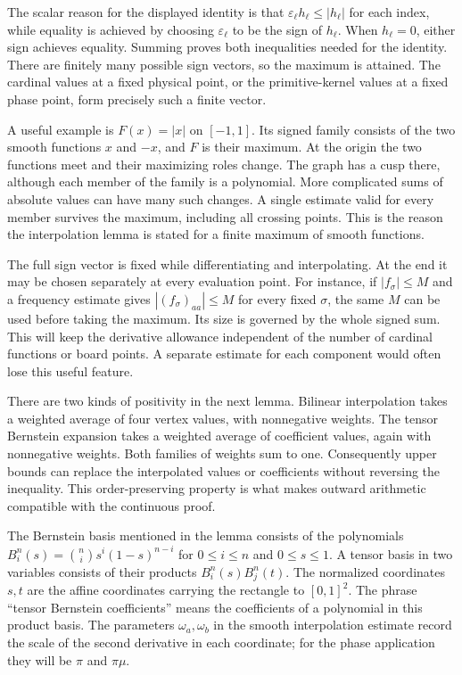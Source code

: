 The scalar reason for the displayed identity is that
$\varepsilon_\ell h_\ell\leq|h_\ell|$ for each index, while equality
is achieved by choosing $\varepsilon_\ell$ to be the sign of $h_\ell$.
When $h_\ell=0$, either sign achieves equality. Summing proves both
inequalities needed for the identity. There are finitely many possible
sign vectors, so the maximum is attained. The cardinal values at a
fixed physical point, or the primitive-kernel values at a fixed phase
point, form precisely such a finite vector.

A useful example is $F(x)=|x|$ on $[-1,1]$. Its signed family consists
of the two smooth functions $x$ and $-x$, and $F$ is their maximum.
At the origin the two functions meet and their maximizing roles change.
The graph has a cusp there, although each member of the family is a
polynomial. More complicated sums of absolute values can have many
such changes. A single estimate valid for every member survives the
maximum, including all crossing points. This is the reason the
interpolation lemma is stated for a finite maximum of smooth functions.

The full sign vector is fixed while differentiating and interpolating.
At the end it may be chosen separately at every evaluation point.
For instance, if $|f_\sigma|\leq M$ and a frequency estimate gives
$|(f_\sigma)_{aa}|\leq M$ for every fixed $\sigma$, the same $M$
can be used before taking the maximum. Its size is governed by the
whole signed sum. This will keep the derivative allowance independent
of the number of cardinal functions or board points. A separate
estimate for each component would often lose this useful feature.

There are two kinds of positivity in the next lemma. Bilinear
interpolation takes a weighted average of four vertex values, with
nonnegative weights. The tensor Bernstein expansion takes a weighted
average of coefficient values, again with nonnegative weights. Both
families of weights sum to one. Consequently upper bounds can replace
the interpolated values or coefficients without reversing the
inequality. This order-preserving property is what makes outward
arithmetic compatible with the continuous proof.

The Bernstein basis mentioned in the lemma consists of the polynomials
$B_i^n(s)=\binom ni s^i(1-s)^{n-i}$ for $0\leq i\leq n$ and
$0\leq s\leq1$. A tensor basis in two variables consists of their
products $B_i^n(s)B_j^n(t)$. The normalized coordinates $s,t$ are the
affine coordinates carrying the rectangle to $[0,1]^2$. The phrase
``tensor Bernstein coefficients'' means the coefficients of a polynomial
in this product basis. The parameters $\omega_a,\omega_b$ in the
smooth interpolation estimate record the scale of the second derivative
in each coordinate; for the phase application they will be $\pi$ and
$\pi\mu$.

